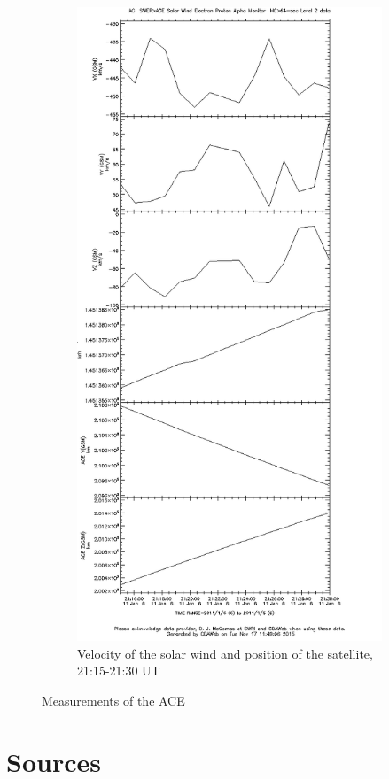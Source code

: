 \documentclass[10pt,a4paper]{article}
\begin{document}
\begin{figure}[h]
\begin{subfigure}[h]{.5\textwidth}
		\includegraphics[width=.8\linewidth]{ace-2115-2130-v-s.png}
		\caption{Velocity of the solar wind and position of the satellite, 21:15-21:30 UT}
		\label{ace4}
	\end{subfigure}
	\caption{Measurements of the ACE}
	\label{ace}
\end{figure}





\section{Sources}
\end{document}

